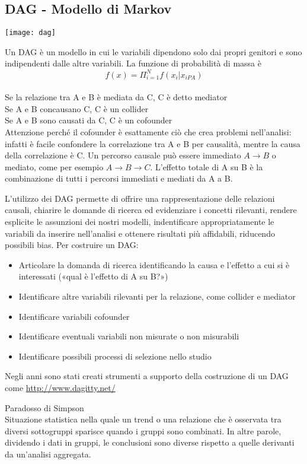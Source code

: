 \subsection{DAG - Modello di Markov}
\begin{marginfigure}
    \texttt{[image: dag]}
\end{marginfigure}
Un DAG è un modello in cui le variabili dipendono solo dai propri genitori e sono 
indipendenti dalle altre variabili. 
La funzione di probabilità di massa è 
\begin{equation}
    f(x) = \Pi_{i = 1}^N f(x_i|x_{iPA})
\end{equation}
\\Se la relazione tra A e B è mediata da C, C è detto mediator\\
Se A e B concausano C, C è un collider\\
Se A e B sono causati da C, C è un cofounder\\
Attenzione perché il cofounder è esattamente ciò che crea problemi nell'analisi: infatti è 
facile confondere la correlazione tra A e B per causalità, mentre la causa della correlazione
è C.
Un percorso causale può essere immediato $A \to B$ o mediato, come per esempio $A \to B \to C$.
L'effetto totale di A su B è la combinazione di tutti i percorsi immediati e mediati da A a B.

L'utilizzo dei DAG permette di offrire una rappresentazione delle relazioni causali,
chiarire le domande di ricerca ed evidenziare i concetti rilevanti, rendere esplicite le 
assunzioni dei nostri modelli, indentificare appropriatamente le variabili da inserire nell’analisi
e ottenere risultati più affidabili, riducendo possibili bias.
Per costruire un DAG: 
\begin{itemize}
    \item Articolare la domanda di ricerca identificando la causa e l’effetto a cui si è 
        interessati («qual è l’effetto di A su B?»)
    \item Identificare altre variabili rilevanti per la relazione, come collider e mediator
    \item Identificare variabili cofounder
    \item Identificare eventuali variabili non misurate o non misurabili
    \item Identificare possibili processi di selezione nello studio
\end{itemize}
Negli anni sono stati creati strumenti a supporto della costruzione di un DAG come 
\url{http://www.dagitty.net/}
\vspace{0.5cm}

\large Paradosso di Simpson
\normalsize
\\Situazione statistica nella quale un trend o una relazione che è osservata tra diversi 
sottogruppi sparisce quando i gruppi sono combinati. In altre parole, dividendo i dati in 
gruppi, le conclusioni sono diverse rispetto a quelle derivanti da un’analisi aggregata.
